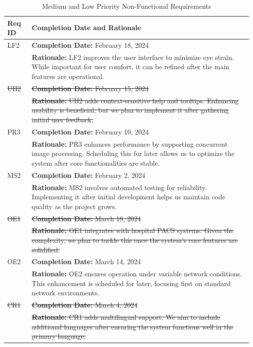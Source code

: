 \documentclass[12pt]{article}
\begin{document}
\begin{table}[H]
  \label{TblMediumLowPriorityNFRs}
  \begin{tabular}{p{}|p{}}
  \toprule
  \textbf{Req ID} & \textbf{Completion Date and Rationale} \\
  \midrule
  LF2 & \textbf{Completion Date:} February 18, 2024\\
      & \textbf{Rationale:} LF2 improves the user interface to minimize eye strain. While important for user comfort, it can be refined after the main features are operational. \\
  \midrule
  \sout{UH2} & \sout{\textbf{Completion Date:} February 15, 2024}\\
      & \sout{\textbf{Rationale:} UH2 adds context-sensitive help and tooltips. Enhancing usability is beneficial, but we plan to implement it after gathering initial user feedback.} \\
  \midrule
  PR3 & \textbf{Completion Date:} February 10, 2024\\
      & \textbf{Rationale:} PR3 enhances performance by supporting concurrent image processing. Scheduling this for later allows us to optimize the system after core functionalities are stable. \\
  \midrule
  MS2 & \textbf{Completion Date:} February 2, 2024\\
      & \textbf{Rationale:} MS2 involves automated testing for reliability. Implementing it after initial development helps us maintain code quality as the project grows. \\
  \midrule
  \sout{OE1} & \sout{\textbf{Completion Date:} March 18, 2024}\\
       & \sout{\textbf{Rationale:} OE1 integrates with hospital PACS systems. Given the complexity, we plan to tackle this once the system's core features are solidified.} \\
  \midrule
  OE2 & \textbf{Completion Date:} March 14, 2024\\
       & \textbf{Rationale:} OE2 ensures operation under variable network conditions. This enhancement is scheduled for later, focusing first on standard network environments. \\
  \midrule
  \sout{CR1} & \sout{\textbf{Completion Date:} March 4, 2024}\\
       & \sout{\textbf{Rationale:} CR1 adds multilingual support. We aim to include additional languages after ensuring the system functions well in the primary language.} \\
  \bottomrule
  \end{tabular}
  \caption{Medium and Low Priority Non-Functional Requirements}
  \end{table}
  
\end{document}

